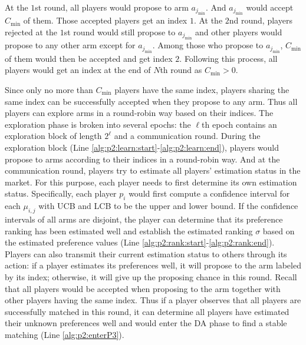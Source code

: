  
At the $1$st round, all players would propose to arm $a_{j_{\min}}$. And $a_{j_{\min}}$ would accept $C_{\min}$ of them. Those accepted players get an index $1$. At the $2$nd round, players rejected at the $1$st round would still propose to $a_{j_{\min}}$ and other players would propose to any other arm except for $a_{j_{\min}}$. Among those who propose to $a_{j_{\min}}$,  $C_{\min}$ of them would then be accepted and get index $2$. Following this process, all players would get an index at the end of $N$th round as $C_{\min}>0$. 


Since only no more than $C_{\min}$ players have the same index, players sharing the same index can be successfully accepted when they propose to any arm. Thus all players can explore arms in a round-robin way based on their indices.  
The exploration phase is broken into several epochs: the $\ell$th epoch contains an exploration block of length $2^\ell$ and a communication round. During the exploration block (Line \ref{alg:p2:learn:start}-\ref{alg:p2:learn:end}), players would propose to arms according to their indices in a round-robin way. And at the communication round, players try to estimate all players' estimation status in the market. 
For this purpose, each player needs to first determine its own estimation status. Specifically, each player $p_i$ would first compute a confidence interval for each $\mu_{i,j}$ with UCB and LCB to be the upper and lower bound. 
If the confidence intervals of all arms are disjoint, the player can determine that its preference ranking has been estimated well and establish the estimated ranking $\sigma$ based on the estimated preference values (Line \ref{alg:p2:rank:start}-\ref{alg:p2:rank:end}). 
Players can also transmit their current estimation status to others through its action: if a player estimates its preferences well, it will propose to the arm labeled by its index; otherwise, it will give up the proposing chance in this round. 
Recall that all players would be accepted when proposing to the arm together with other players having the same index. Thus if a player observes that all players are successfully matched in this round, it can determine all players have estimated their unknown preferences well and would enter the DA phase to find a stable matching (Line \ref{alg:p2:enterP3}).

